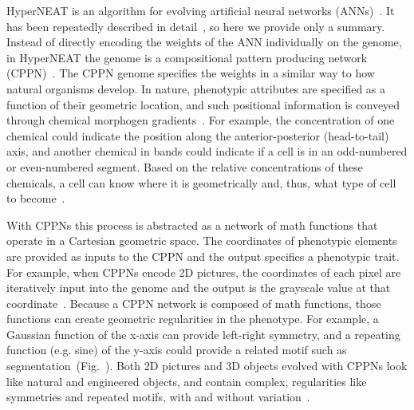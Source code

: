 HyperNEAT is an algorithm for evolving artificial neural networks (ANNs)~\cite{stanley2009hypercube}. It has been repeatedly described in detail~\cite{stanley2009hypercube, gauci2007generating, clune2011performance},  so here we provide only a summary. Instead of directly encoding the weights of the ANN individually on the genome, in HyperNEAT the genome is a compositional pattern producing network (CPPN)~\cite{stanley2007compositional}. The CPPN genome specifies the weights in a similar way to how natural organisms develop. In nature, phenotypic attributes are specified as a function of their geometric location, and such positional information is conveyed through chemical morphogen gradients~\cite{carroll2005endless}. For example, the concentration of one chemical could indicate the position along the anterior-posterior (head-to-tail) axis, and another chemical in bands could indicate if a cell is in an odd-numbered or even-numbered segment. Based on the relative concentrations of these chemicals, a cell can know where it is geometrically and, thus, what type of cell to become~\cite{carroll2005endless}. 

With CPPNs this process is abstracted as a network of math functions that operate in a Cartesian geometric space. The coordinates of phenotypic elements are provided as inputs to the CPPN and the output specifies a phenotypic trait. For example, when CPPNs encode 2D pictures, the coordinates of each pixel are iteratively input into the genome and the output is the grayscale value at that coordinate~\cite{secretan2011picbreeder}. Because a CPPN network is composed of math functions, those functions can create geometric regularities in the phenotype. For example, a Gaussian function of the x-axis can provide left-right symmetry, and a repeating function (e.g. sine) of the y-axis could provide a related motif such as segmentation~(Fig.~). Both 2D pictures and 3D objects evolved with CPPNs look like natural and engineered objects, and contain complex, regularities like symmetries and repeated motifs, with and without variation~\cite{secretan2011picbreeder, clune2011objects}. 



